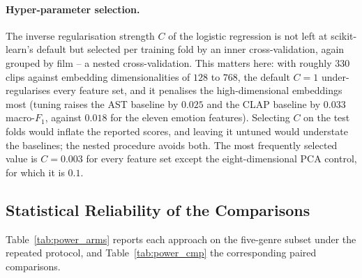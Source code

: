\paragraph{Hyper-parameter selection.}
The inverse regularisation strength $C$ of the logistic regression is not left at
scikit-learn's default but selected per training fold by an inner cross-validation, again
grouped by film -- a nested cross-validation. This matters here: with roughly $330$ clips
against embedding dimensionalities of $128$ to $768$, the default $C=1$ under-regularises
every feature set, and it penalises the high-dimensional embeddings most (tuning raises
the AST baseline by $0.025$ and the CLAP baseline by $0.033$ macro-$F_1$, against $0.018$
for the eleven emotion features). Selecting $C$ on the test folds would inflate the
reported scores, and leaving it untuned would understate the baselines; the nested
procedure avoids both. The most frequently selected value is $C=0.003$ for every feature
set except the eight-dimensional PCA control, for which it is $0.1$.

\subsection{Statistical Reliability of the Comparisons}
\label{subsec:statistical_power}

Table~\ref{tab:power_arms} reports each approach on the five-genre subset under the
repeated protocol, and Table~\ref{tab:power_cmp} the corresponding paired comparisons.

